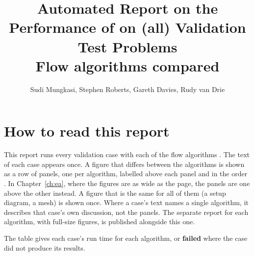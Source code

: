 \documentclass[11pt,a4paper]{report}
\begin{document}

\title{Automated Report on the Performance of \anuga{} on (all) Validation
Test Problems\\[6pt] \large Flow algorithms \algnames{} compared}
\author{Sudi Mungkasi, Stephen Roberts, Gareth Davies, Rudy van Drie}
\maketitle
\tableofcontents

\chapter*{How to read this report}
This report runs every validation case with each of the flow algorithms
\algnames{}. The text of each case appears once. A figure that differs
between the algorithms is shown as a row of panels, one per algorithm,
labelled above each panel and in the order \algnames{}. In
Chapter~\ref{ch:ea}, where the figures are as wide as the page, the panels
are one above the other instead. A figure that is the
same for all of them (a setup diagram, a mesh) is shown once. Where a case's
text names a single algorithm, it describes that case's own discussion, not
the panels. The separate report for each algorithm, with full-size figures,
is published alongside this one.

The table gives each case's run time for each algorithm, or \textbf{failed}
where the case did not produce its results.

\begin{small}

\end{small}






\end{document}
